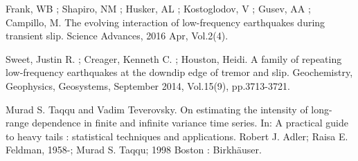 \documentclass[methods.tex]{subfiles}
\begin{document}
Frank, WB ; Shapiro, NM ; Husker, AL ; Kostoglodov, V ; Gusev, AA ; Campillo, M. The evolving interaction of low-frequency earthquakes during transient slip. Science Advances, 2016 Apr, Vol.2(4).

Sweet, Justin R. ; Creager, Kenneth C. ; Houston, Heidi. A family of repeating low‐frequency earthquakes at the downdip edge of tremor and slip. Geochemistry, Geophysics, Geosystems, September 2014, Vol.15(9), pp.3713-3721.

Murad S. Taqqu and Vadim Teverovsky. On estimating the intensity of long-range dependence in finite and infinite variance time series. In: A practical guide to heavy tails : statistical techniques and applications. Robert J. Adler; Raisa E. Feldman, 1958-; Murad S. Taqqu; 1998 Boston : Birkhäuser.
\end{document}
